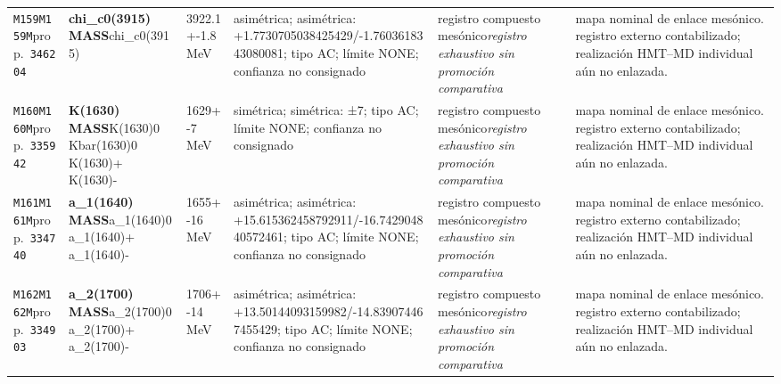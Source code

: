 \begin{landscape}
\begin{longtable}{L{1.85cm}L{4.45cm}L{2.35cm}L{4.05cm}L{3.35cm}L{7.15cm}}
\texttt{M159}\newline \texttt{M159M}\newline prop.\ \texttt{346204} & \textbf{chi\_\allowbreak{}c0(3915) MASS}\newline chi\_\allowbreak{}c0(3915) & 3922.1+-1.8\,MeV & asimétrica; asimétrica: +1.7730705038425429/-1.7603618343080081; tipo AC; límite NONE; confianza no consignado & registro compuesto mesónico\newline \emph{registro exhaustivo sin promoción comparativa} & mapa nominal de enlace mesónico. registro externo contabilizado; realización HMT--MD individual aún no enlazada. \\
\texttt{M160}\newline \texttt{M160M}\newline prop.\ \texttt{335942} & \textbf{K(1630) MASS}\newline K(1630)0 \textbar{}\allowbreak{} Kbar(1630)0 \textbar{}\allowbreak{} K(1630)+ \textbar{}\allowbreak{} K(1630)- & 1629+-7\,MeV & simétrica; simétrica: ±7; tipo AC; límite NONE; confianza no consignado & registro compuesto mesónico\newline \emph{registro exhaustivo sin promoción comparativa} & mapa nominal de enlace mesónico. registro externo contabilizado; realización HMT--MD individual aún no enlazada. \\
\texttt{M161}\newline \texttt{M161M}\newline prop.\ \texttt{334740} & \textbf{a\_\allowbreak{}1(1640) MASS}\newline a\_\allowbreak{}1(1640)0 \textbar{}\allowbreak{} a\_\allowbreak{}1(1640)+ \textbar{}\allowbreak{} a\_\allowbreak{}1(1640)- & 1655+-16\,MeV & asimétrica; asimétrica: +15.615362458792911/-16.742904840572461; tipo AC; límite NONE; confianza no consignado & registro compuesto mesónico\newline \emph{registro exhaustivo sin promoción comparativa} & mapa nominal de enlace mesónico. registro externo contabilizado; realización HMT--MD individual aún no enlazada. \\
\texttt{M162}\newline \texttt{M162M}\newline prop.\ \texttt{334903} & \textbf{a\_\allowbreak{}2(1700) MASS}\newline a\_\allowbreak{}2(1700)0 \textbar{}\allowbreak{} a\_\allowbreak{}2(1700)+ \textbar{}\allowbreak{} a\_\allowbreak{}2(1700)- & 1706+-14\,MeV & asimétrica; asimétrica: +13.50144093159982/-14.839074467455429; tipo AC; límite NONE; confianza no consignado & registro compuesto mesónico\newline \emph{registro exhaustivo sin promoción comparativa} & mapa nominal de enlace mesónico. registro externo contabilizado; realización HMT--MD individual aún no enlazada. \\

\end{longtable}
\end{landscape}
